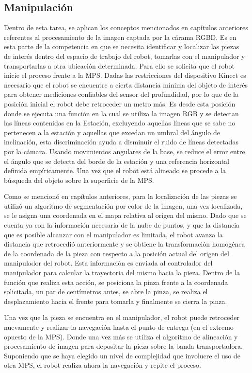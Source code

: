 \subsection{Manipulación}
Dentro de esta tarea, se aplican los conceptos mencionados en capítulos anteriores referentes al procesamiento de la imagen captada por la cárama RGBD.
Es en esta parte de la competencia en que se necesita identificar y localizar las piezas de interés dentro del espacio de trabajo del robot, tomarlas con el manipulador y transportarlas a otra ubicación determinada.
Para ello se solicita que el robot inicie el proceso frente a la MPS. Dadas las restricciones del dispositivo Kinect es necesario que el robot se encuentre a cierta distancia mínima del objeto de interés para obtener mediciones confiables del sensor del profundidad, por lo que de la posición inicial el robot debe retroceder un metro más. Es desde esta posición donde se ejecuta una función en la cual se utiliza la imagen RGB y se detectan las líneas contenidas en la Estación, excluyendo aquellas líneas que se sabe no pertenecen a la estación y aquellas que excedan un umbral del ángulo de inclinación, esta discriminación ayuda a disminuir el ruido de líneas detectadas por la cámara. Usando movimientos angulares de la base, se reduce el error entre el ángulo que se detecta del borde de la estación y una referencia horizontal definida empíricamente. Una vez que el robot está alineado se procede a la búsqueda del objeto sobre la superficie de la MPS.

Como se mencionó en capítulos anteriores, para la localización de las piezas se utilizó un algoritmo de segmentación por color de la imagen, una vez localizada, se le asigna una coordenada en el mapa relativa al origen del mismo. Dado que se cuenta ya con la información necesaria de la nube de puntos, y que la distancia que es posible alcanzar con el manipulador es limitada, el robot avanza la distancia que retrocedió anteriormente y se obtiene la transformación homogénea de la coordenada de la pieza con respecto a la posición actual del origen del manipulador del robot. Esta información es enviada al controlador del manipulador para calcular la trayectoria del mismo hacia la pieza. Dentro de la función que realiza esta acción, se posiciona la pinza frente a la coordenada solicitada, un par de centímetros antes, se abre la pinza, se realiza el desplazamiento hacia el frente para tomarla y finalmente se cierra la pinza. 

Una vez que la pieza se encuentra en el manipulador, el robot puede retroceder nuevamente y realizar la navegación hasta el punto de entrega (en el extremo opuesto de la MPS). Donde una vez más se utiliza el algoritmo de alineación y procesamiento de imagen para depositar la pieza sobre la banda transportadora. Suponiendo que se haya elegido un nivel de complejidad que involucre el uso de otra MPS, el robot realiza ahora la navegación y repite el proceso.

